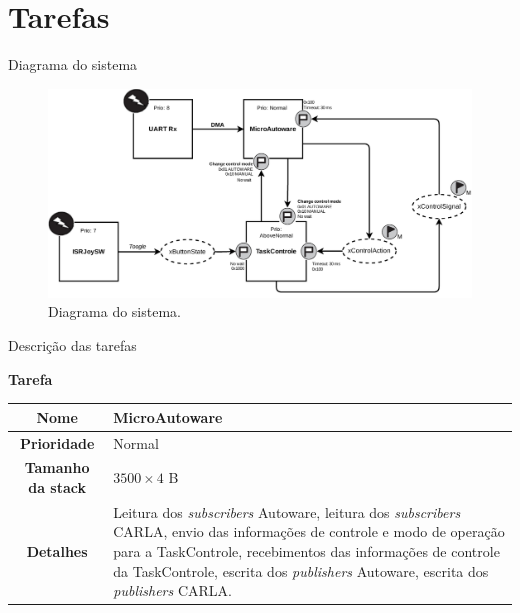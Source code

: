 \documentclass{if-beamer}
\begin{document}
\section{Tarefas}



\begin{frame}{Diagrama do sistema}
	
	\begin{figure}
		\centering
		\includegraphics[width = \textwidth]{img/system_diagram}
		\caption{Diagrama do sistema.}
		\label{fig:systemdiagram}
	\end{figure}
	
\end{frame}

\begin{frame}{Descrição das tarefas}

\begin{block}{\textbf{Tarefa}}
	
	\centering
	
	\begin{tabular}{c|p{8cm}}
		\textbf{Nome} & MicroAutoware \\
		\hline
		\textbf{Prioridade}& Normal \\
		\hline
		\textbf{Tamanho da stack} & $3500 \times 4$ B \\
		\hline
		\textbf{Detalhes} & Leitura dos \textit{subscribers} Autoware, leitura dos \textit{subscribers} CARLA, envio das informações de controle e modo de operação para a TaskControle, recebimentos das informações de controle da TaskControle, escrita dos \textit{publishers} Autoware, escrita dos \textit{publishers} CARLA. \\
	\end{tabular}
	
\end{block}	

\end{frame}
\end{document}
